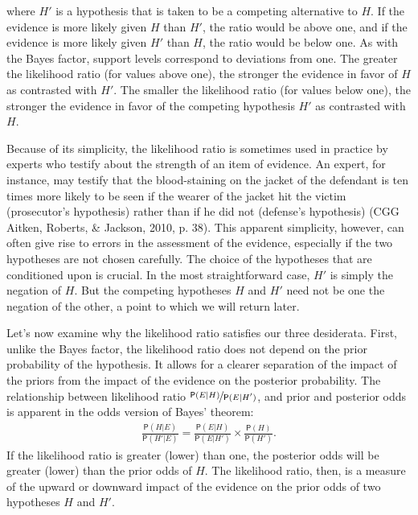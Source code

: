 \documentclass[
  10pt,
  dvipsnames,enabledeprecatedfontcommands]{scrartcl}
\newcommand{\pr}[1]{\mathsf{P}(#1)}
\begin{document}
\noindent where \(H'\) is a hypothesis that is taken to be a competing
alternative to \(H\). If the evidence is more likely given \(H\) than
\(H'\), the ratio would be above one, and if the evidence is more likely
given \(H'\) than \(H\), the ratio would be below one. As with the Bayes
factor, support levels correspond to deviations from one. The greater
the likelihood ratio (for values above one), the stronger the evidence
in favor of \(H\) as contrasted with \(H'\). The smaller the likelihood
ratio (for values below one), the stronger the evidence in favor of the
competing hypothesis \(H'\) as contrasted with \(H\).

Because of its simplicity, the likelihood ratio is sometimes used in
practice by experts who testify about the strength of an item of
evidence. An expert, for instance, may testify that the blood-staining
on the jacket of the defendant is ten times more likely to be seen if
the wearer of the jacket hit the victim (prosecutor's hypothesis) rather
than if he did not (defense's hypothesis) (CGG Aitken, Roberts, \&
Jackson, 2010, p. 38). This apparent simplicity, however, can often give
rise to errors in the assessment of the evidence, especially if the two
hypotheses are not chosen carefully. The choice of the hypotheses that
are conditioned upon is crucial. In the most straightforward case,
\(H'\) is simply the negation of \(H\). But the competing hypotheses
\(H\) and \(H'\) need not be one the negation of the other, a point to
which we will return later.

Let's now examine why the likelihood ratio satisfies our three
desiderata. First, unlike the Bayes factor, the likelihood ratio does
not depend on the prior probability of the hypothesis. It allows for a
clearer separation of the impact of the priors from the impact of the
evidence on the posterior probability. The relationship between
likelihood ratio \(\nicefrac{\pr{E \vert H}}{\pr{E \vert H'}}\), and
prior and posterior odds is apparent in the odds version of Bayes'
theorem: \begin{align}\label{eq:BTodds}
\frac{\pr{H \vert E}}{\pr{H' \vert E}}= \frac{\pr{E \vert H}}{\pr{E \vert H'}}\times \frac{\pr{H}}{\pr{H'}}.
\end{align} \noindent If the likelihood ratio is greater (lower) than
one, the posterior odds will be greater (lower) than the prior odds of
\(H\). The likelihood ratio, then, is a measure of the upward or
downward impact of the evidence on the prior odds of two hypotheses
\(H\) and \(H'\).
\end{document}
